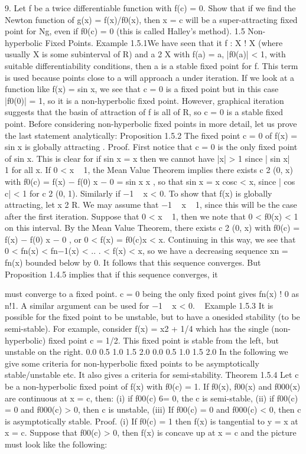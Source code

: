 \documentclass[12pt]{article}
\begin{document}
\begin{enumerate}
\begin{enumerate}
9. Let f be a twice differentiable function with f(c) = 0. Show that if we find the
Newton function of g(x) = f(x)/f0(x), then x = c will be a super-attracting fixed
point for Ng, even if f0(c) = 0 (this is called Halley’s method).
1.5 Non-hyperbolic Fixed Points.
Example 1.5.1We have seen that it f : X ! X (where usually X is some subinterval
of R) and a 2 X with f(a) = a, |f0(a)| < 1, with suitable differentiability conditions,
then a is a stable fixed point for f. This term is used because points close to a will
approach a under iteration. If we look at a function like f(x) = sin x, we see that
c = 0 is a fixed point but in this case |f0(0)| = 1, so it is a non-hyperbolic fixed point.
However, graphical iteration suggests that the basin of attraction of f is all of R, so
c = 0 is a stable fixed point. Before considering non-hyperbolic fixed points in more
detail, let us prove the last statement analytically:
Proposition 1.5.2 The fixed point c = 0 of f(x) = sin x is globally attracting .
Proof. First notice that c = 0 is the only fixed point of sin x. This is clear for if
sin x = x then we cannot have |x| > 1 since | sin x|   1 for all x. If 0 < x   1, the
Mean Value Theorem implies there exists c 2 (0, x) with
f0(c) =
f(x) − f(0)
x − 0
=
sin x
x
,
so that
sin x = x cosc < x,
since | cos c| < 1 for c 2 (0, 1). Similarly if −1   x < 0.
To show that f(x) is globally attracting, let x 2 R. We may assume that −1  
x   1, since this will be the case after the first iteration.
Suppose that 0 < x   1, then we note that 0 < f0(x) < 1 on this interval. By the
Mean Value Theorem, there exists c 2 (0, x) with
f0(c) =
f(x) − f(0)
x − 0
, or 0 < f(x) = f0(c)x < x.
Continuing in this way, we see that
0 < fn(x) < fn−1(x) < .. . < f(x) < x,
so we have a decreasing sequence xn = fn(x) bounded below by 0. It follows that this
sequence converges. But Proposition 1.4.5 implies that if this sequence converges, it

must converge to a fixed point. c = 0 being the only fixed point gives fn(x) ! 0 as
n!1. A similar argument can be used for −1   x < 0.  
Example 1.5.3 It is possible for the fixed point to be unstable, but to have a onesided
stability (to be semi-stable). For example, consider f(x) = x2 + 1/4 which has
the single (non-hyperbolic) fixed point c = 1/2. This fixed point is stable from the
left, but unstable on the right.
0.0 0.5 1.0 1.5 2.0
0.0
0.5
1.0
1.5
2.0
In the following we give some criteria for non-hyperbolic fixed points to be asymptotically
stable/unstable etc. It also gives a criteria for semi-stability.
Theorem 1.5.4 Let c be a non-hyperbolic fixed point of f(x) with f0(c) = 1. If f0(x),
f00(x) and f000(x) are continuous at x = c, then:
(i) if f00(c) 6= 0, the c is semi-stable,
(ii) if f00(c) = 0 and f000(c) > 0, then c is unstable,
(iii) If f00(c) = 0 and f000(c) < 0, then c is asymptotically stable.
Proof. (i) If f0(c) = 1 then f(x) is tangential to y = x at x = c. Suppose that
f00(c) > 0, then f(x) is concave up at x = c and the picture must look like the
following:


\end{enumerate}
\end{enumerate}
\end{document}
